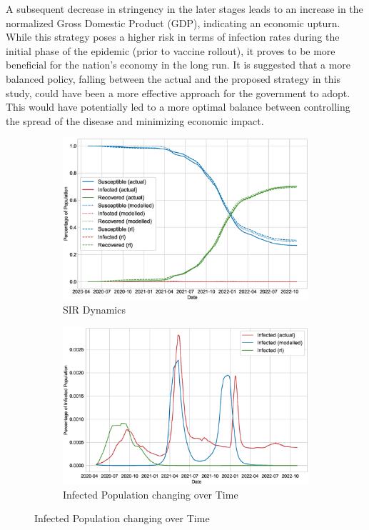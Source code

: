 \documentclass[tikz,fleqn,12pt]{wlscirep}
\begin{document}
A subsequent decrease in stringency in the later stages leads to an increase in the normalized Gross Domestic Product (GDP), indicating an economic upturn. While this strategy poses a higher risk in terms of infection rates during the initial phase of the epidemic (prior to vaccine rollout), it proves to be more beneficial for the nation's economy in the long run. It is suggested that a more balanced policy, falling between the actual and the proposed strategy in this study, could have been a more effective approach for the government to adopt. This would have potentially led to a more optimal balance between controlling the spread of the disease and minimizing economic impact.
\begin{figure}[htbp!]
  \centering
  \caption{Strategy from Reinforcement Learning Agent 2}
  \begin{subfigure}[t]{0.48\textwidth}
    \centering
    \includegraphics[width=\linewidth]{images/244620/rl_sir.eps}
    \caption{SIR Dynamics}
  \end{subfigure}
  \label{fig:244620_rl_sir}
  \hfill
  \begin{subfigure}[t]{0.48\textwidth}
    \centering
    \includegraphics[width=\linewidth]{images/244620/rl_i.eps}
    \caption{Infected Population changing over Time}
  \end{subfigure}
  \label{fig:244620_rl_i}


\end{figure}
\end{document}
